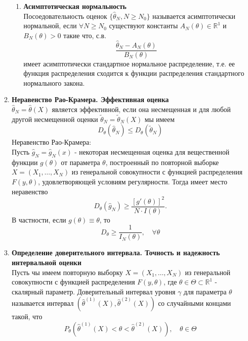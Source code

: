 \documentclass[A4]{article}
\begin{document}
\begin{enumerate}
\begin{enumerate}
		\item \textbf{Асимптотическая нормальность}\\
		Посоедовательность оценок $\{\hat{\theta}_N,N\ge N_0\}$ называется асимптотически нормальной, если $\forall N\ge N_0$ существуют константы $A_N(\theta)\in \mathbb{R}^1$ и $B_N(\theta)>0$ такие что, с.в. 
		\begin{equation}
		\frac{\hat{\theta}_N-A_N(\theta)}{B_N(\theta)}
		\end{equation}
		имеет асимптотически стандартное нормальное распределение, т.е. ее функция распределения сходится к функции распределения стандартного нормального закона.
	\end{enumerate}
	\item \textbf{Неравенство Рао-Крамера. Эффективная оценка}\\
	$\hat{\theta}_N=\hat{\theta}(X)$ является эффективной, если она несмещенная и для любой другой несмещенной оценки $\tilde{\theta}_N=\tilde{\theta}_N(X)$ мы имеем
	\begin{equation}
	D_{\theta}(\hat{\theta}_N)\le D_{\theta}(\tilde{\theta}_N)
	\end{equation}
	Неравенство Рао-Крамера:\\
	Пусть $\hat{g}_N=\hat{g}_N(x)$ - некоторая несмещенная оценка для вещественной функции $g(\theta)$ от параметра $\theta$, построенный по повторной выборке $X=(X_1,\ldots,X_N)$ из генеральной совокупности с функцией распределения $F(y,\theta)$, удовлетворяющей условиям регулярности. Тогда имеет место неравенство
	\begin{equation}
	D_{\theta}(\hat{g}_N)\ge \frac{[g'(\theta)]^2}{N\cdot I(\theta)}.
	\end{equation}
	В частности, если $g(\theta)\equiv\theta$, то
	\begin{equation}
	D_{\theta}\ge\frac{1}{I_N(\theta)},\quad \forall \theta
	\end{equation}
	\item \textbf{Определение доверительного интервала. Точность и надежность интервальной оценки}\\
	Пусть чы имеем повторную выборку $X=(X_1,\ldots,X_N)$ из генеральной совокупности с функцией распределения $F(y,\theta)$, где $\theta\in\Theta\subset \mathbb{R}^1$ - скалярный параметр. Доверительный интервал уровня $\gamma$ для параметра $\theta$ называется интервал $(\hat{\theta}^{(1)}(X),\hat{\theta}^{(2)}(X))$ со случайными концами такой, что 
	\begin{equation}
	P_{\theta}(\hat{\theta}^{(1)}(X)<\theta<\hat{\theta}^{(2)}(X)),\quad \theta\in\Theta

\end{equation}
\end{enumerate}
\end{document}
